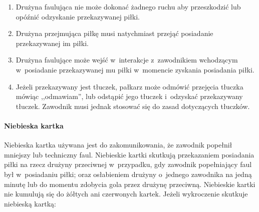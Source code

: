 \documentclass[12pt,a4paper]{article}
\begin{document}
\begin{enumerate}
	      \begin{enumerate}
		      \item
		            Drużyna faulująca nie może dokonać żadnego ruchu aby przeszkodzić
		            lub opóźnić odzyskanie przekazywanej piłki.
		      \item
		            Drużyna przejmująca piłkę musi natychmiast przejąć posiadanie
		            przekazywanej im piłki.
		      \item
		            Drużyna faulujące może wejść w~interakcje z~zawodnikiem wchodzącym w~posiadanie przekazywanej mu piłki w~momencie zyskania posiadania
		            piłki.
		      \item
		            Jeżeli przekazywany jest tłuczek, pałkarz może odmówić przejęcia
		            tłuczka mówiąc ,,odmawiam'', lub odstąpić jego tłuczek i~odzyskać
		            przekazywany tłuczek. Zawodnik musi jednak stosować się do zasad
		            dotyczących tłuczków.
	      \end{enumerate}
\end{enumerate}

\paragraph{Niebieska kartka}
Niebieska kartka używana jest do
zakomunikowania, że zawodnik popełnił mniejszy lub techniczny faul.
Niebieskie kartki skutkują przekazaniem posiadania piłki na rzecz
drużyny przeciwnej w~przypadku, gdy zawodnik popełniający faul był w~posiadaniu piłki; oraz osłabieniem drużyny o~jednego zawodnika na jedną
minutę lub do momentu zdobycia gola przez drużynę przeciwną. Niebieskie
kartki nie kumulują się do żółtych ani czerwonych kartek. Jeżeli
wykroczenie skutkuje niebieską kartką:
\end{document}
